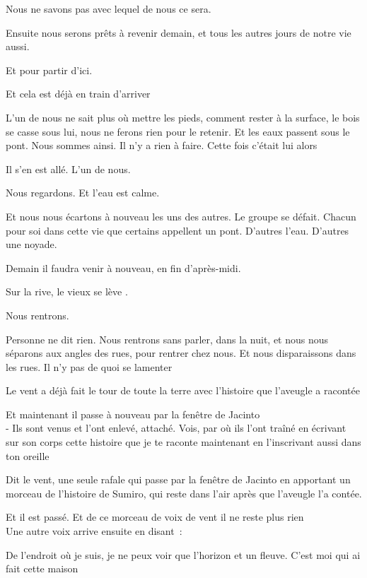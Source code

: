Nous ne savons pas avec lequel de nous ce sera.

Ensuite nous serons prêts à revenir demain, et tous les autres jours de
notre vie aussi.

Et pour partir d'ici.

Et cela est déjà en train d'arriver

L'un de nous ne sait plus où mettre les pieds, comment rester à la
surface, le bois se casse sous lui, nous ne ferons rien pour le retenir.
Et les eaux passent sous le pont. Nous sommes ainsi. Il n'y a rien à
faire. Cette fois c'était lui alors

Il s'en est allé. L'un de nous.

Nous regardons. Et l'eau est calme.

Et nous nous écartons à nouveau les uns des autres. Le groupe se défait.
Chacun pour soi dans cette vie que certains appellent un pont. D'autres
l'eau. D'autres une noyade.

Demain il faudra venir à nouveau, en fin d'après-midi.

Sur la rive, le vieux se lève .

Nous rentrons.

Personne ne dit rien. Nous rentrons sans parler, dans la nuit, et nous
nous séparons aux angles des rues, pour rentrer chez nous. Et nous
disparaissons dans les rues. Il n'y pas de quoi se lamenter

\clearpage
\thispagestyle{empty}
\movetoevenpage

Le vent a déjà fait le tour de toute la terre avec l'histoire que
l'aveugle a racontée

Et maintenant il passe à nouveau par la fenêtre de Jacinto\\

- Ils sont venus et l'ont enlevé, attaché. Vois, par où ils l'ont traîné
en écrivant sur son corps cette histoire que je te raconte maintenant en
l'inscrivant aussi dans ton oreille

Dit le vent, une seule rafale qui passe par la fenêtre de Jacinto en
apportant un morceau de l'histoire de Sumiro, qui reste dans l'air après
que l'aveugle l'a contée.

Et il est passé. Et de ce morceau de voix de vent il ne reste plus rien\\

Une autre voix arrive ensuite en disant~:

De l'endroit où je suis, je ne peux voir que l'horizon et un fleuve.
C'est moi qui ai fait cette maison

